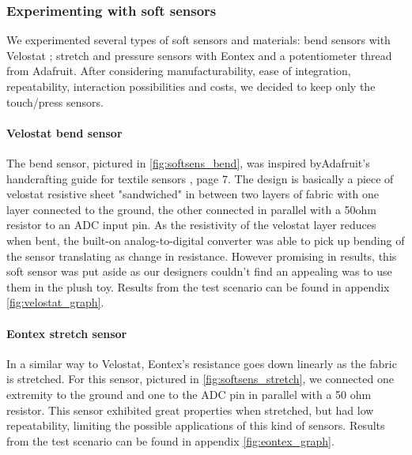     \subsubsection{Experimenting with soft sensors} 
We experimented several types of soft sensors and materials: bend sensors with Velostat \cite{velostat}; stretch and pressure sensors with Eontex \cite{eontex} and a potentiometer thread from Adafruit. After considering manufacturability, ease of integration, repeatability, interaction possibilities and costs, we decided to keep only the touch/press sensors.

\paragraph{Velostat bend sensor} The bend sensor, pictured in \ref{fig:softsens_bend}, was inspired byAdafruit's handcrafting guide for textile sensors \cite{textile_sensors}, page 7. The design is basically a piece of velostat resistive sheet "sandwiched" in between two layers of fabric with one layer connected to the ground, the other connected in parallel with a 50ohm resistor to an ADC input pin. As the resistivity of the velostat layer reduces when bent, the built-on analog-to-digital converter was able to pick up bending of the sensor translating as change in resistance. 
\newline However promising in results, this soft sensor was put aside as our designers couldn't find an appealing was to use them in the plush toy. Results from the test scenario can be found in appendix \ref{fig:velostat_graph}.

\paragraph{Eontex stretch sensor} In a similar way to Velostat, Eontex's resistance goes down linearly as the fabric is stretched. For this sensor, pictured in \ref{fig:softsens_stretch}, we connected one extremity to the ground and one to the ADC pin in parallel with a 50 ohm resistor. This sensor exhibited great properties when stretched, but had low repeatability, limiting the possible applications of this kind of sensors.  Results from the test scenario can be found in appendix \ref{fig:eontex_graph}.


